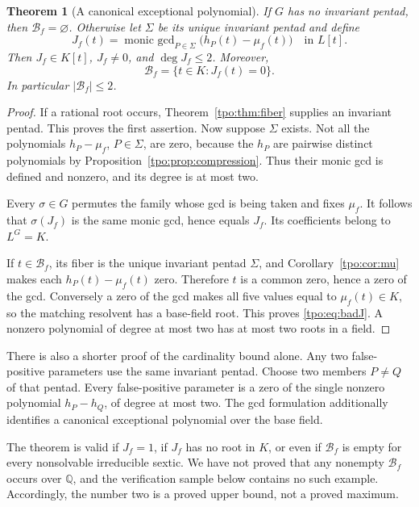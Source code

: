 \documentclass[11pt,letterpaper]{article}
\numberwithin{equation}{section}
\newtheorem{theorem}{Theorem}[section]
\theoremstyle{definition}
\theoremstyle{remark}
\newcommand{\QQ}{\mathbb Q}
\begin{document}
\begin{theorem}[A canonical exceptional polynomial]
\label{tpo:thm:exceptional}
If $G$ has no invariant pentad, then $\mathcal B_f=\varnothing$. Otherwise
let $\Sigma$ be its unique invariant pentad and define
\begin{equation}
 J_f(t)=\operatorname{monic\ gcd}_{P\in\Sigma}
                  \bigl(h_P(t)-\mu_f(t)\bigr)\quad\text{in }L[t].
 \label{tpo:eq:J}
\end{equation}
Then $J_f\in K[t]$, $J_f\ne0$, and $\deg J_f\le2$. Moreover,
\begin{equation}
 \mathcal B_f=\{t\in K:J_f(t)=0\}.
 \label{tpo:eq:badJ}
\end{equation}
In particular $|\mathcal B_f|\le2$.
\end{theorem}
\begin{proof}
If a rational root occurs, Theorem~\ref{tpo:thm:fiber} supplies an invariant
pentad. This proves the first assertion. Now suppose $\Sigma$ exists. Not
all the polynomials $h_P-\mu_f$, $P\in\Sigma$, are zero, because the $h_P$
are pairwise distinct polynomials by Proposition~\ref{tpo:prop:compression}.
Thus their monic gcd is defined and nonzero, and its degree is at most two.

Every $\sigma\in G$ permutes the family whose gcd is being taken and fixes
$\mu_f$. It follows that $\sigma(J_f)$ is the same monic gcd, hence equals
$J_f$. Its coefficients belong to $L^G=K$.

If $t\in\mathcal B_f$, its fiber is the unique invariant pentad $\Sigma$,
and Corollary~\ref{tpo:cor:mu} makes each $h_P(t)-\mu_f(t)$ zero. Therefore
$t$ is a common zero, hence a zero of the gcd. Conversely a zero of the
gcd makes all five values equal to $\mu_f(t)\in K$, so the matching
resolvent has a base-field root. This proves \eqref{tpo:eq:badJ}. A nonzero
polynomial of degree at most two has at most two roots in a field.
\end{proof}

There is also a shorter proof of the cardinality bound alone. Any two
false-positive parameters use the same invariant pentad. Choose two
members $P\ne Q$ of that pentad. Every false-positive parameter is a zero
of the single nonzero polynomial $h_P-h_Q$, of degree at most two.
The gcd formulation additionally identifies a canonical exceptional
polynomial over the base field.

\begin{remark}
The theorem is valid if $J_f=1$, if $J_f$ has no root in $K$, or even if
$\mathcal B_f$ is empty for every nonsolvable irreducible sextic. We have
not proved that any nonempty $\mathcal B_f$ occurs over $\QQ$, and the
verification sample below contains no such example. Accordingly, the number
two is a proved upper bound, not a proved maximum.
\end{remark}
\end{document}

